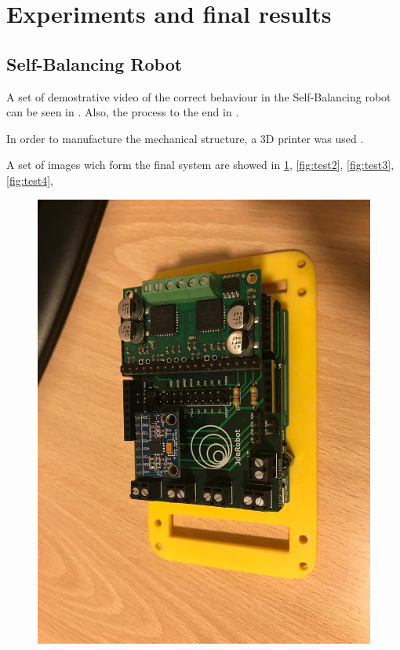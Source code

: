 \section{Experiments and final results}
\subsection{Self-Balancing Robot}
\newline 
A set of demostrative video of the correct behaviour in the Self-Balancing robot can be seen in \cite{self2}. Also, the process to the end in \cite{self1} \cite{self3}.\newline

In order to manufacture the mechanical structure, a 3D printer was used \cite{print1}.

A set of images wich form the final system are showed in \ref{fig:test1}, \ref{fig:test2}, \ref{fig:test3}, \ref{fig:test4},

\begin{center}
\begin{figure}[H]
	\center
	\includegraphics[scale=0.2, angle=270]{imagenes/Balancing_Robot/test1}
	\caption{}
	\label{fig:test1}
\end{figure}
\end{center}

